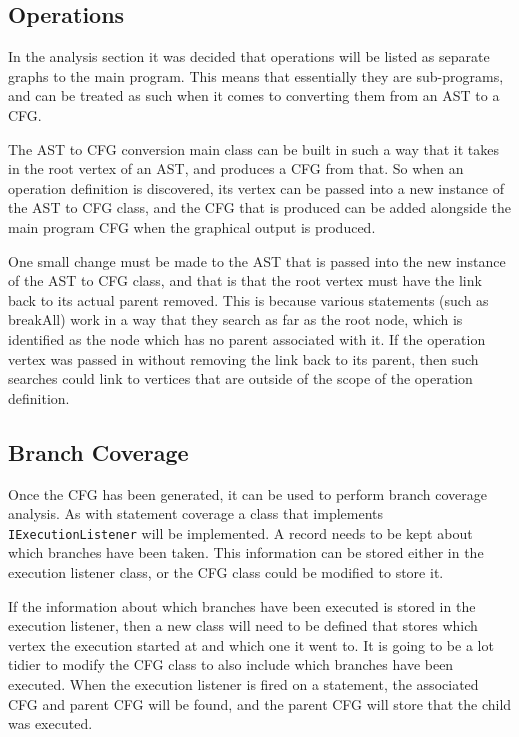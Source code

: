 \subsection{Operations}

In the analysis section it was decided that operations will be listed as separate graphs to the main program. This means that essentially they are sub-programs, and can be treated as such when it comes to converting them from an AST to a CFG.

The AST to CFG conversion main class can be built in such a way that it takes in the root vertex of an AST, and produces a CFG from that. So when an operation definition is discovered, its vertex can be passed into a new instance of the AST to CFG class, and the CFG that is produced can be added alongside the main program CFG when the graphical output is produced.

One small change must be made to the AST that is passed into the new instance of the AST to CFG class, and that is that the root vertex must have the link back to its actual parent removed. This is because various statements (such as breakAll) work in a way that they search as far as the root node, which is identified as the node which has no parent associated with it. If the operation vertex was passed in without removing the link back to its parent, then such searches could link to vertices that are outside of the scope of the operation definition. 


\subsection{Branch Coverage}

Once the CFG has been generated, it can be used to perform branch coverage analysis. As with statement coverage a class that implements \verb|IExecutionListener| will be implemented. A record needs to be kept about which branches have been taken. This information can be stored either in the execution listener class, or the CFG class could be modified to store it.

If the information about which branches have been executed is stored in the execution listener, then a new class will need to be defined that stores which vertex the execution started at and which one it went to. It is going to be a lot tidier to modify the CFG class to also include which branches have been executed. When the execution listener is fired on a statement, the associated CFG and parent CFG will be found, and the parent CFG will store that the child was executed.

